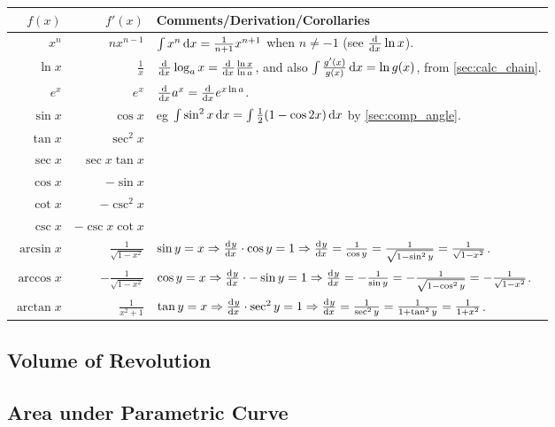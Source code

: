 \documentclass[a4paper,11pt]{article}
\begin{document}
    \begin{center}
    \begin{longtable}{rrl}
    \toprule
    \boldmath$f(x)$ & \boldmath$f'(x)$ &
    \bfseries Comments/Derivation/Corollaries \\
    \midrule
    \endhead
    $x^n$ & $nx^{n-1}$
        & $\int x^n \dif x = \frac{1}{n + 1}x^{n + 1}$ when
          $n \neq -1$ (see $\od{}{x}\ln x$).\\
    $\ln x$ & $\frac{1}{x}$
        & $\od{}{x}\log_a x = \od{}{x} \frac{\ln x}{\ln a}$, and also
          $\int \frac{g'(x)}{g(x)} \dif x = \ln g(x)$,
            from \ref{sec:calc_chain}.\\
    $e^x$ & $e^x$ & $\od{}{x}a^x = \od{}{x}e^{x \ln a}$. \\
    $\sin x$ & $\cos x$
        & eg $\int \sin^2 x \dif x = \int \frac 12 (1 - \cos 2x) \dif x$
          by \ref{sec:comp_angle}. \\
    $\tan x$ & $\sec^2 x$ \\
    $\sec x$ & $\sec x \tan x$ \\
    $\cos x$ & $-\sin x$ \\
    $\cot x$ & $-\csc^2 x$ \\
    $\csc x$ & $-\csc x \cot x$ \\
    $\arcsin x$ & $\frac{1}{\sqrt{1 - x^2}}$
        & $\sin y = x \Rightarrow \od yx \cdot \cos y = 1 \Rightarrow
           \od yx = \frac{1}{\cos y}
         = \frac{1}{\sqrt{1 - \sin^2 y}} = \frac{1}{\sqrt{1 - x^2}}$. \\
    $\arccos x$ & $-\frac{1}{\sqrt{1 - x^2}}$
        & $\cos y = x \Rightarrow \od yx \cdot -\sin y = 1 \Rightarrow
           \od yx = -\frac{1}{\sin y}
         = -\frac{1}{\sqrt{1 - \cos^2 y}} = -\frac{1}{\sqrt{1 - x^2}}$. \\
    $\arctan x$ & $\frac{1}{x^2 + 1}$
        & $\tan y = x \Rightarrow \od yx \cdot \sec^2 y = 1 \Rightarrow
           \od yx = \frac{1}{\sec^2 y} = \frac{1}{1 + \tan^2 y}
         = \frac{1}{1 + x^2}$. \\
    \bottomrule
    \end{longtable}
    \end{center}

    \subsection{Volume of Revolution}

    \subsection{Area under Parametric Curve} \label{sec:calc_parametric_area}
\end{document}
